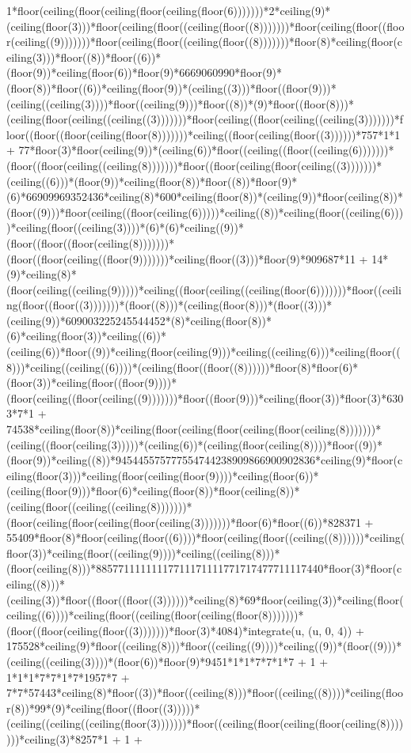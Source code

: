 1*floor(ceiling(floor(ceiling(floor(ceiling(floor(6)))))))*2*ceiling(9)*(ceiling(floor(3)))*floor(ceiling(floor((ceiling(floor((8)))))))*floor(ceiling(floor((floor(ceiling((9)))))))*floor(ceiling(floor((ceiling(floor((8)))))))*floor(8)*ceiling(floor(ceiling(3)))*floor((8))*floor((6))*(floor(9))*ceiling(floor(6))*floor(9)*6669060990*floor(9)*(floor(8))*floor((6))*ceiling(floor(9))*(ceiling((3)))*floor((floor(9)))*(ceiling((ceiling(3))))*floor((ceiling(9)))*floor((8))*(9)*floor((floor(8)))*(ceiling(floor(ceiling((ceiling((3)))))))*floor(ceiling((floor(ceiling((ceiling(3)))))))*floor((floor((floor(ceiling(floor(8)))))))*ceiling((floor(ceiling(floor((3))))))*757*1*1 + 77*floor(3)*floor(ceiling(9))*(ceiling(6))*floor((ceiling((floor((ceiling(6)))))))*(floor((floor(ceiling((ceiling(8)))))))*floor((floor(ceiling(floor(ceiling((3)))))))*(ceiling((6)))*(floor(9))*ceiling(floor(8))*floor((8))*floor(9)*(6)*66909969352436*ceiling(8)*600*ceiling(floor(8))*(ceiling(9))*floor(ceiling(8))*(floor((9)))*floor(ceiling((floor(ceiling(6)))))*ceiling((8))*ceiling(floor((ceiling(6))))*ceiling(floor((ceiling(3))))*(6)*(6)*ceiling((9))*(floor((floor((floor(ceiling(8)))))))*(floor((floor(ceiling((floor(9)))))))*ceiling(floor((3)))*floor(9)*909687*11 + 14*(9)*ceiling(8)*(floor(ceiling((ceiling(9)))))*ceiling((floor(ceiling((ceiling(floor(6)))))))*floor((ceiling(floor((floor((3)))))))*(floor((8)))*(ceiling(floor(8)))*(floor((3)))*(ceiling(9))*609003225245544452*(8)*ceiling(floor(8))*(6)*ceiling(floor(3))*ceiling((6))*(ceiling(6))*floor((9))*ceiling(floor(ceiling(9)))*ceiling((ceiling(6)))*ceiling(floor((8)))*ceiling((ceiling((6))))*(ceiling(floor((floor((8))))))*floor(8)*floor(6)*(floor(3))*ceiling(floor((floor(9))))*(floor(ceiling((floor(ceiling((9)))))))*floor((floor(9)))*ceiling(floor(3))*floor(3)*6303*7*1 + 74538*ceiling(floor(8))*ceiling(floor(ceiling(floor(ceiling(floor(ceiling(8)))))))*(ceiling((floor(ceiling(3)))))*(ceiling(6))*(ceiling(floor(ceiling(8))))*floor((9))*(floor(9))*ceiling((8))*945445575777554744238909866900902836*ceiling(9)*floor(ceiling(floor(3)))*ceiling(floor(ceiling(floor(9))))*ceiling(floor(6))*(ceiling(floor(9)))*floor(6)*ceiling(floor(8))*floor(ceiling(8))*(ceiling(floor((ceiling((ceiling(8)))))))*(floor(ceiling(floor(ceiling(floor(ceiling(3)))))))*floor(6)*floor((6))*828371 + 55409*floor(8)*floor(ceiling(floor((6))))*floor(ceiling(floor((ceiling((8))))))*ceiling(floor(3))*ceiling(floor((ceiling(9))))*ceiling((ceiling(8)))*(floor(ceiling(8)))*88577111111117711171111771717477711117440*floor(3)*floor(ceiling((8)))*(ceiling(3))*floor((floor((floor((3))))))*ceiling(8)*69*floor(ceiling(3))*ceiling(floor(ceiling((6))))*ceiling(floor((ceiling(floor(ceiling(floor(8)))))))*(floor((floor(ceiling(floor((3)))))))*floor(3)*4084)*integrate(u, (u, 0, 4)) + 175528*ceiling(9)*floor((ceiling(8)))*floor((ceiling((9))))*ceiling((9))*(floor((9)))*(ceiling((ceiling(3))))*(floor(6))*floor(9)*9451*1*1*7*7*1*7 + 1 + 1*1*1*7*7*1*7*1957*7 + 7*7*57443*ceiling(8)*floor((3))*floor((ceiling(8)))*floor((ceiling((8))))*ceiling(floor(8))*99*(9)*ceiling(floor((floor((3)))))*(ceiling((ceiling((ceiling(floor(3)))))))*floor((ceiling(floor(ceiling(floor(ceiling(8)))))))*ceiling(3)*8257*1 + 1 + 